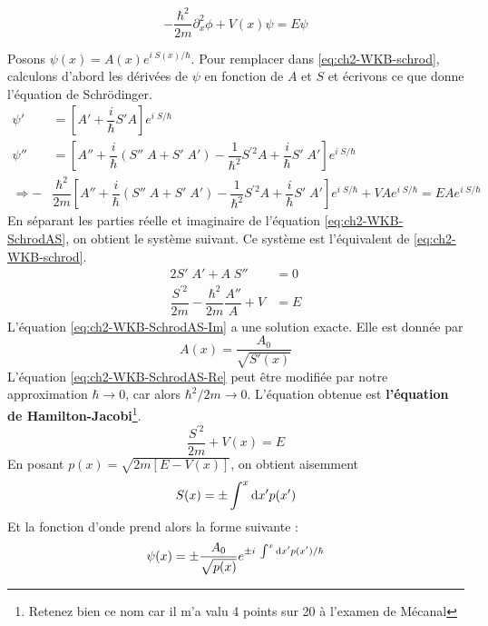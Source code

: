 \documentclass[12pt, a4paper]{book}
\begin{document}
\begin{equation}\label{eq:ch2-WKB-schrod}
  -\dfrac{\hbar^2}{2m} \partial_x ^2 \phi + V(x)\psi = E\psi
\end{equation}

Posons $\psi(x) = A(x) e^{i\; S(x)/\hbar}$. Pour remplacer dans \ref{eq:ch2-WKB-schrod}, calculons d'abord les dérivées de $\psi$ en fonction de $A$ et $S$ et écrivons ce que donne l'équation de Schrödinger.
\begin{align}
  \psi' &= \left[ A' + \dfrac{i}{\hbar} S' A\right]e^{i\; S/\hbar} \\
  \psi'' &= \left[A'' + \dfrac{i}{\hbar} (S''\; A + S'\; A') - \dfrac{1}{\hbar ^2} S^{\prime 2} A + \dfrac{i}{\hbar} S' \; A'\right] e ^{i\; S/\hbar} \\
  \Rightarrow -&\dfrac{\hbar ^2 }{2m} \left[A'' + \dfrac{i}{\hbar} (S''\; A + S'\; A') - \dfrac{1}{\hbar ^2} S^{\prime 2} A + \dfrac{i}{\hbar} S' \; A'\right] e ^{i\; S/\hbar} + VA e ^{i\; S/\hbar} = EA e ^{i\; S/\hbar} \label{eq:ch2-WKB-SchrodAS}
\end{align}
En séparant les parties réelle et imaginaire de l'équation \ref{eq:ch2-WKB-SchrodAS}, on obtient le système suivant. Ce système est l'équivalent de \ref{eq:ch2-WKB-schrod}.
\begin{align}
      2S' \; A' + A \; S'' &= 0 \label{eq:ch2-WKB-SchrodAS-Im} \\
      \dfrac{S^{\prime 2}}{2m} - \dfrac{\hbar ^2}{2m} \dfrac{A''}{A} + V &= E \label{eq:ch2-WKB-SchrodAS-Re} 
\end{align}
L'équation \ref{eq:ch2-WKB-SchrodAS-Im} a une solution exacte. Elle est donnée par 
\begin{equation}
  A(x) = \dfrac{A_0}{\sqrt{S'(x)}}
\end{equation}
L'équation \ref{eq:ch2-WKB-SchrodAS-Re} peut être modifiée par notre approximation $\hbar \longrightarrow 0$, car alors $\hbar ^2/2m \longrightarrow 0$. L'équation obtenue est \textbf{l'équation de Hamilton-Jacobi}\footnote{Retenez bien ce nom car il m'a valu 4 points sur 20 à l'examen de Mécanal}.
\begin{equation}
  \dfrac{S^{\prime 2}}{2m} + V(x) = E
\end{equation}
En posant $p(x) = \sqrt{2m[E - V(x)]}$, on obtient aisemment
\begin{equation}
  S(x) = \pm \int ^x \mathrm{d} x' p(x')
\end{equation}
Et la fonction d'onde prend alors la forme suivante :
\begin{equation} \label{eq:ch2-WKB-solution}
  \psi(x) = \pm \dfrac{A_0}{\sqrt{p(x)}} e^{\pm i \; \int ^x \mathrm{d} x' p(x')/\hbar}
\end{equation}
\end{document}
